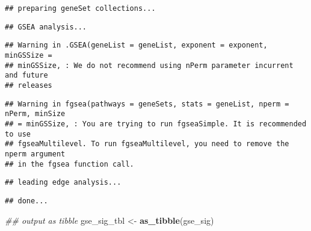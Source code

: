 \documentclass[
]{article}
\newenvironment{Shaded}{\begin{snugshade}}{\end{snugshade}}
\newcommand{\CommentTok}[1]{\textcolor[rgb]{0.56,0.35,0.01}{\textit{#1}}}
\newcommand{\DataTypeTok}[1]{\textcolor[rgb]{0.13,0.29,0.53}{#1}}
\newcommand{\DecValTok}[1]{\textcolor[rgb]{0.00,0.00,0.81}{#1}}
\newcommand{\FloatTok}[1]{\textcolor[rgb]{0.00,0.00,0.81}{#1}}
\newcommand{\KeywordTok}[1]{\textcolor[rgb]{0.13,0.29,0.53}{\textbf{#1}}}
\newcommand{\NormalTok}[1]{#1}
\newcommand{\OperatorTok}[1]{\textcolor[rgb]{0.81,0.36,0.00}{\textbf{#1}}}
\newcommand{\StringTok}[1]{\textcolor[rgb]{0.31,0.60,0.02}{#1}}
\begin{document}
\begin{Shaded}
\end{Shaded}

\begin{verbatim}
## preparing geneSet collections...
\end{verbatim}

\begin{verbatim}
## GSEA analysis...
\end{verbatim}

\begin{verbatim}
## Warning in .GSEA(geneList = geneList, exponent = exponent, minGSSize =
## minGSSize, : We do not recommend using nPerm parameter incurrent and future
## releases
\end{verbatim}

\begin{verbatim}
## Warning in fgsea(pathways = geneSets, stats = geneList, nperm = nPerm, minSize
## = minGSSize, : You are trying to run fgseaSimple. It is recommended to use
## fgseaMultilevel. To run fgseaMultilevel, you need to remove the nperm argument
## in the fgsea function call.
\end{verbatim}

\begin{verbatim}
## leading edge analysis...
\end{verbatim}

\begin{verbatim}
## done...
\end{verbatim}

\begin{Shaded}
\begin{Highlighting}[]
\CommentTok{## output as tibble}
\NormalTok{gse_sig_tbl <-}\StringTok{ }\KeywordTok{as_tibble}\NormalTok{(gse_sig)}
\end{Highlighting}
\end{Shaded}
\end{document}
